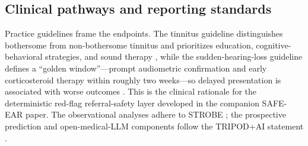 \subsection{Clinical pathways and reporting standards}
Practice guidelines frame the endpoints. The tinnitus guideline distinguishes
bothersome from non-bothersome tinnitus and prioritizes education,
cognitive-behavioral strategies, and sound therapy \citep{tunkel2014cpg}, while the
sudden-hearing-loss guideline defines a ``golden window''---prompt audiometric
confirmation and early corticosteroid therapy within roughly two weeks---so delayed
presentation is associated with worse outcomes \citep{chandrasekhar2019ssnhl}. This
is the clinical rationale for the deterministic red-flag referral-safety layer
developed in the companion SAFE-EAR paper. The observational analyses adhere to
STROBE \citep{vonelm2007strobe}; the prospective prediction and open-medical-LLM
components follow the TRIPOD+AI statement \citep{collins2024tripodai}.
